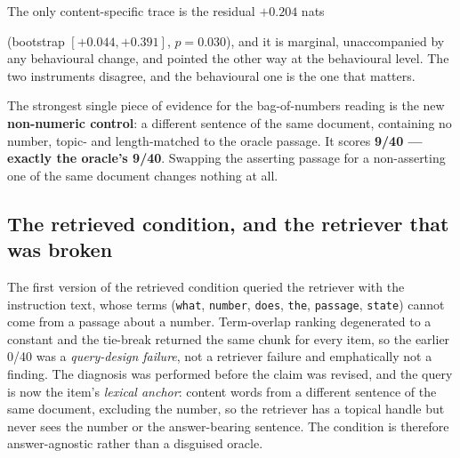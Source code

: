\documentclass[11pt,a4paper]{article}
\begin{document}
The only content-specific trace is the residual $+0.204$ nats %

(bootstrap $[+0.044, +0.391]$, $p = 0.030$), and it is marginal, unaccompanied
by any behavioural change, and pointed the other way at the behavioural level.
The two instruments disagree, and the behavioural one is the one that matters.

The strongest single piece of evidence for the bag-of-numbers reading is the
new \textbf{non-numeric control}: a different sentence of the same document,
containing no number, topic- and length-matched to the oracle passage. It
scores \textbf{9/40 --- exactly the oracle's 9/40}. Swapping the asserting
passage for a non-asserting one of the same document changes nothing at all.

\subsection{The retrieved condition, and the retriever that was broken}
\label{sec:act8-retrieval}

The first version of the retrieved condition queried the retriever with the
instruction text, whose terms (\texttt{what}, \texttt{number}, \texttt{does},
\texttt{the}, \texttt{passage}, \texttt{state}) cannot come from a passage about
a number. Term-overlap ranking degenerated to a constant and the tie-break
returned the same chunk for every item, so the earlier 0/40 was a
\emph{query-design failure}, not a retriever failure and emphatically not a
finding. The diagnosis was performed before the claim was revised, and the
query is now the item's \emph{lexical anchor}: content words from a different
sentence of the same document, excluding the number, so the retriever has a
topical handle but never sees the number or the answer-bearing sentence. The
condition is therefore answer-agnostic rather than a disguised oracle.
\end{document}
